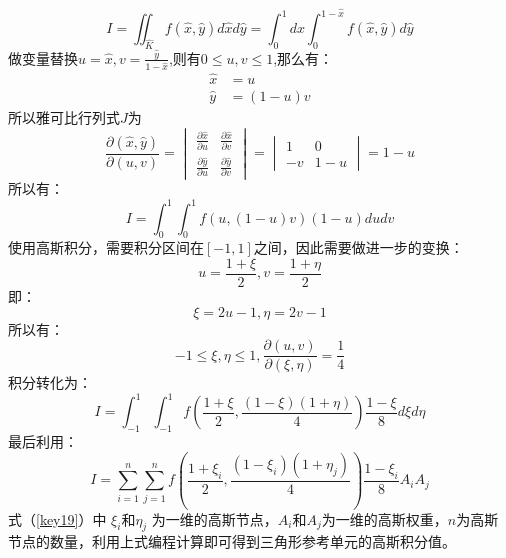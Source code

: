 \documentclass{article}                          %
\numberwithin{equation}{subsection}              %
\begin{document}
	\begin{equation}\label{key}
	I=\iint_{\hat{K}}f(\hat{x},\hat{y})d\hat{x}d\hat{y}=\int_{0}^{1}d\hat{x} \int_{0}^{1-\hat{x}}f(\hat{x},\hat{y})d\hat{y}
	\end{equation}
做变量替换$ u=\hat{x},v=\frac{\hat{y}}{1-\hat{x}} $,则有$ 0\leq u,v \leq 1 $,那么有：
		\begin{equation}\label{key}
		\begin{aligned}
		\hat{x}&=u\\
		\hat{y}&=(1-u)v
		\end{aligned}
		\end{equation}
所以雅可比行列式$ J $为
		\begin{equation}\label{key}
		\frac{\partial (\hat{x},\hat{y})}{\partial (u,v)}=
		\begin{vmatrix}
		\frac{\partial \hat{x}}{\partial u}  &\frac{\partial \hat{x}}{\partial v} \\
		\frac{\partial \hat{y}}{\partial u}  &\frac{\partial \hat{y}}{\partial v}
		\end{vmatrix}
		=
		\begin{vmatrix}
		1   &0 \\
		-v  &1-u
		\end{vmatrix}=1-u
		\end{equation}
所以有：
		\begin{equation}\label{key}
		I=\int_{0}^{1} \int_{0}^{1} f(u,(1-u)v)(1-u)dudv
		\end{equation}
使用高斯积分，需要积分区间在$ [-1,1] $之间，因此需要做进一步的变换：
		\begin{equation}\label{key}
		u=\frac{1+\xi}{2},v=\frac{1+\eta}{2}
		\end{equation}
即：
		\begin{equation}\label{key}
		\xi=2u-1,\eta=2v-1
		\end{equation}
所以有：
		\begin{equation}\label{key}
		-1\leq \xi,\eta\leq 1, \frac{\partial (u,v)}{\partial (\xi,\eta)}=\frac{1}{4}
		\end{equation}
积分转化为：
		\begin{equation}\label{key}
		I=\int_{-1}^{1} \int_{-1}^{1} f(\frac{1+\xi}{2},\frac{(1-\xi)(1+\eta)}{4}) \frac{1-\xi}{8}d\xi d\eta
		\end{equation}
最后利用：
		\begin{equation}\label{key19}
		I=\sum_{i=1}^{n} \sum_{j=1}^{n}  f(\frac{1+\xi_i}{2},\frac{(1-\xi_i)(1+\eta_j)}{4}) \frac{1-\xi_{i}}{8} A_i A_j
		\end{equation}
式（\ref{key19}）中 $ \xi_i $和$ \eta_j $ 为一维的高斯节点，$ A_i $和$ A_j$为一维的高斯权重，$ n $为高斯节点的数量，利用上式编程计算即可得到三角形参考单元的高斯积分值。
\end{document}
